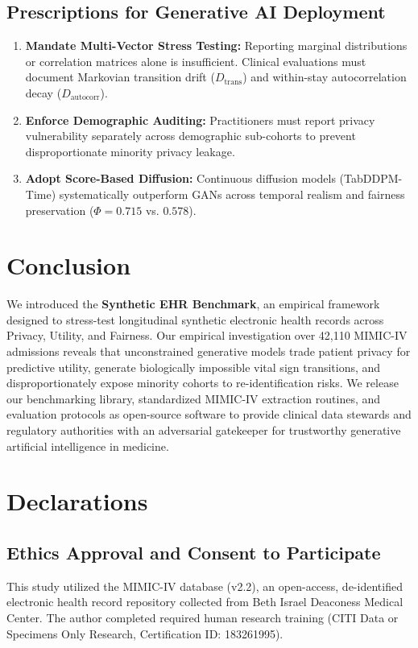 \documentclass[journal]{IEEEtran}
\begin{document}
\subsection{Prescriptions for Generative AI Deployment}
\begin{enumerate}
    \item \textbf{Mandate Multi-Vector Stress Testing:} Reporting marginal distributions or correlation matrices alone is insufficient. Clinical evaluations must document Markovian transition drift ($D_{\text{trans}}$) and within-stay autocorrelation decay ($D_{\text{autocorr}}$).
    \item \textbf{Enforce Demographic Auditing:} Practitioners must report privacy vulnerability separately across demographic sub-cohorts to prevent disproportionate minority privacy leakage.
    \item \textbf{Adopt Score-Based Diffusion:} Continuous diffusion models (TabDDPM-Time) systematically outperform GANs across temporal realism and fairness preservation ($\Phi = 0.715$ vs. $0.578$).
\end{enumerate}

\section{Conclusion}
We introduced the \textbf{Synthetic EHR Benchmark}, an empirical framework designed to stress-test longitudinal synthetic electronic health records across Privacy, Utility, and Fairness. Our empirical investigation over 42,110 MIMIC-IV admissions reveals that unconstrained generative models trade patient privacy for predictive utility, generate biologically impossible vital sign transitions, and disproportionately expose minority cohorts to re-identification risks. We release our benchmarking library, standardized MIMIC-IV extraction routines, and evaluation protocols as open-source software to provide clinical data stewards and regulatory authorities with an adversarial gatekeeper for trustworthy generative artificial intelligence in medicine.

\section*{Declarations}
\subsection*{Ethics Approval and Consent to Participate}
This study utilized the MIMIC-IV database (v2.2), an open-access, de-identified electronic health record repository collected from Beth Israel Deaconess Medical Center. The author completed required human research training (CITI Data or Specimens Only Research, Certification ID: 183261995).
\end{document}
